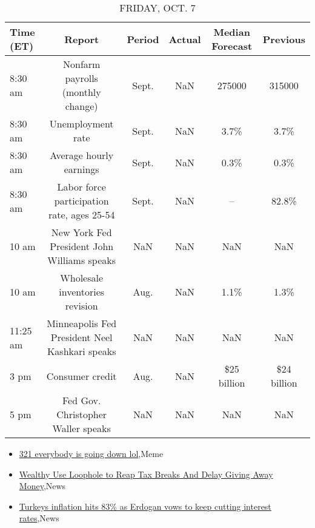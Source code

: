 \documentclass{article}%
\begin{document}
%


\begin{table}[htbp]%
\caption{FRIDAY, OCT. 7}%
\centering%
\begin{adjustbox}{width=1\textwidth}%
\begin{tabular}{lccccc}
\toprule
Time (ET) &                                         Report & Period & Actual & Median Forecast &    Previous \\
\midrule
  8:30 am &              Nonfarm payrolls (monthly change) &  Sept. &    NaN &          275000 &      315000 \\
  8:30 am &                              Unemployment rate &  Sept. &    NaN &            3.7\% &        3.7\% \\
  8:30 am &                        Average hourly earnings &  Sept. &    NaN &            0.3\% &        0.3\% \\
  8:30 am &     Labor force participation rate, ages 25-54 &  Sept. &    NaN &              -- &       82.8\% \\
    10 am &    New York Fed President John Williams speaks &    NaN &    NaN &             NaN &         NaN \\
    10 am &                 Wholesale inventories revision &   Aug. &    NaN &            1.1\% &        1.3\% \\
 11:25 am & Minneapolis Fed President Neel Kashkari speaks &    NaN &    NaN &             NaN &         NaN \\
     3 pm &                                Consumer credit &   Aug. &    NaN &     \$25 billion & \$24 billion \\
     5 pm &             Fed Gov. Christopher Waller speaks &    NaN &    NaN &             NaN &         NaN \\
\bottomrule
\end{tabular}
%
\end{adjustbox}%
\end{table}

%
\begin{itemize}%
\item%
\href{https://reddit.com/r/StockMarket/comments/xudmjt/321\_everybody\_is\_going\_down\_lol/}{321 everybody is going down lol},Meme%
\item%
\href{https://reddit.com/r/Economics/comments/xugvyk/wealthy\_use\_loophole\_to\_reap\_tax\_breaks\_and\_delay/}{Wealthy Use Loophole to Reap Tax Breaks  And Delay Giving Away Money},News%
\item%
\href{https://reddit.com/r/Economics/comments/xufmx7/turkeys\_inflation\_hits\_83\_as\_erdogan\_vows\_to\_keep/}{Turkeys inflation hits 83\% as Erdogan vows to keep cutting interest rates},News%
\end{itemize}%
\end{document}

